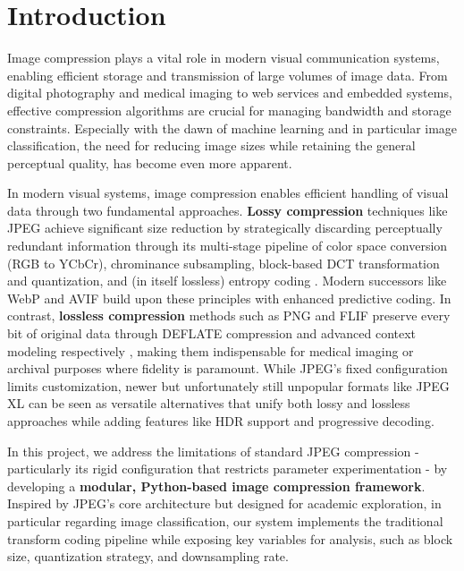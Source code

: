 \section{Introduction}
\label{sec:intro}

Image compression plays a vital role in modern visual communication systems, enabling efficient storage and transmission of large volumes of image data. From digital photography and medical imaging to web services and embedded systems, effective compression algorithms are crucial for managing bandwidth and storage constraints. Especially with the dawn of machine learning and in particular image classification, the need for reducing image sizes while retaining the general perceptual quality, has become even more apparent.

In modern visual systems, image compression enables efficient handling of visual data through two fundamental approaches. \textbf{Lossy compression} techniques like JPEG achieve significant size reduction by strategically discarding perceptually redundant information through its multi-stage pipeline of color space conversion (RGB to YCbCr), chrominance subsampling, block-based DCT transformation and quantization, and (in itself lossless) entropy coding \cite{haines1992compression,jpegOverview2025}. Modern successors like WebP and AVIF build upon these principles with enhanced predictive coding. In contrast, \textbf{lossless compression} methods such as PNG and FLIF preserve every bit of original data through DEFLATE compression and advanced context modeling respectively \cite{flif2016}, making them indispensable for medical imaging or archival purposes where fidelity is paramount. While JPEG's fixed configuration limits customization, newer but unfortunately still unpopular formats like JPEG XL \cite{jpegxl2021} can be seen as versatile alternatives that unify both lossy and lossless approaches while adding features like HDR support and progressive decoding.

\noindent In this project, we address the limitations of standard JPEG compression - particularly its rigid configuration that restricts parameter experimentation - by developing a \textbf{modular, Python-based image compression framework}. Inspired by JPEG's core architecture but designed for academic exploration, in particular regarding image classification, our system implements the traditional transform coding pipeline while exposing key variables for analysis, such as block size, quantization strategy, and downsampling rate. 

